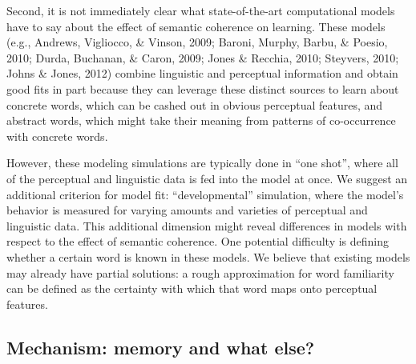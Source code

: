 \documentclass[man,floatsintext]{apa6}
\begin{document}
Second, it is not immediately clear what state-of-the-art computational models have to say about the effect of semantic coherence on learning. These models (e.g., Andrews, Vigliocco, \& Vinson, 2009; Baroni, Murphy, Barbu, \& Poesio, 2010; Durda, Buchanan, \& Caron, 2009; Jones \& Recchia, 2010; Steyvers, 2010; Johns \& Jones, 2012) combine linguistic and perceptual information and obtain good fits in part because they can leverage these distinct sources to learn about concrete words, which can be cashed out in obvious perceptual features, and abstract words, which might take their meaning from patterns of co-occurrence with concrete words.

However, these modeling simulations are typically done in ``one shot'', where all of the perceptual and linguistic data is fed into the model at once. We suggest an additional criterion for model fit: ``developmental'' simulation, where the model's behavior is measured for varying amounts and varieties of perceptual and linguistic data. This additional dimension might reveal differences in models with respect to the effect of semantic coherence. One potential difficulty is defining whether a certain word is known in these models. We believe that existing models may already have partial solutions: a rough approximation for word familiarity can be defined as the certainty with which that word maps onto perceptual features.


\subsection{Mechanism: memory and what else?}
\end{document}
